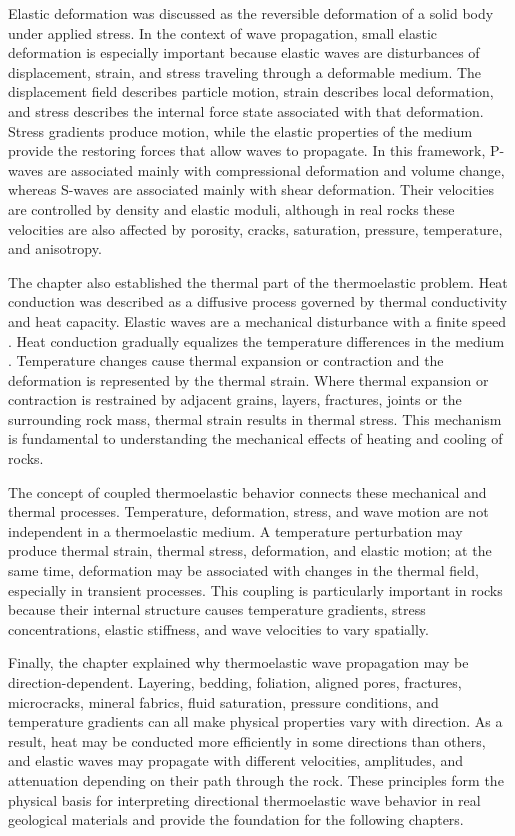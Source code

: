 Elastic deformation was discussed as the reversible deformation of a solid body under applied stress. In the context of wave propagation, small elastic deformation is especially important because elastic waves are disturbances of displacement, strain, and stress traveling through a deformable medium. The displacement field describes particle motion, strain describes local deformation, and stress describes the internal force state associated with that deformation. Stress gradients produce motion, while the elastic properties of the medium provide the restoring forces that allow waves to propagate. In this framework, P-waves are associated mainly with compressional deformation and volume change, whereas S-waves are associated mainly with shear deformation. Their velocities are controlled by density and elastic moduli, although in real rocks these velocities are also affected by porosity, cracks, saturation, pressure, temperature, and anisotropy.

The chapter also established the thermal part of the thermoelastic problem. Heat conduction was described as a diffusive process governed by thermal conductivity and heat capacity. Elastic waves are a mechanical disturbance with a finite speed . Heat conduction gradually equalizes the temperature differences in the medium . Temperature changes cause thermal expansion or contraction and the deformation is represented by the thermal strain. Where thermal expansion or contraction is restrained by adjacent grains, layers, fractures, joints or the surrounding rock mass, thermal strain results in thermal stress. This mechanism is fundamental to understanding the mechanical effects of heating and cooling of rocks.

The concept of coupled thermoelastic behavior connects these mechanical and thermal processes. Temperature, deformation, stress, and wave motion are not independent in a thermoelastic medium. A temperature perturbation may produce thermal strain, thermal stress, deformation, and elastic motion; at the same time, deformation may be associated with changes in the thermal field, especially in transient processes. This coupling is particularly important in rocks because their internal structure causes temperature gradients, stress concentrations, elastic stiffness, and wave velocities to vary spatially.

Finally, the chapter explained why thermoelastic wave propagation may be direction-dependent. Layering, bedding, foliation, aligned pores, fractures, microcracks, mineral fabrics, fluid saturation, pressure conditions, and temperature gradients can all make physical properties vary with direction. As a result, heat may be conducted more efficiently in some directions than others, and elastic waves may propagate with different velocities, amplitudes, and attenuation depending on their path through the rock. These principles form the physical basis for interpreting directional thermoelastic wave behavior in real geological materials and provide the foundation for the following chapters.